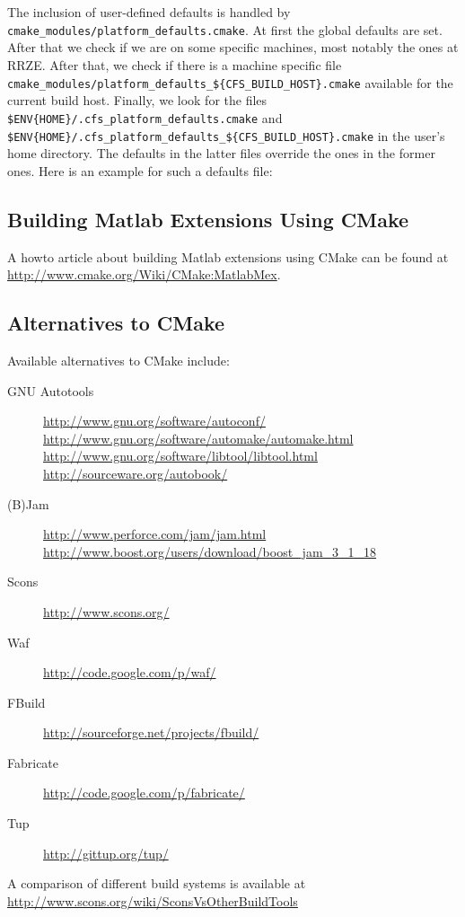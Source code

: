 The    inclusion   of    user-defined    defaults   is    handled   by    {\tt
cmake\_modules/platform\_defaults.cmake}.   At first  the global  defaults are
set. After that we check if we are on some specific machines, most notably the
ones at RRZE.  After  that, we check if there is a  machine specific file {\tt
cmake\_modules/platform\_defaults\_\$\{CFS\_BUILD\_HOST\}.cmake} available for
the   current   build  host.    Finally,   we   look   for  the   files   {\tt
\$ENV\{HOME\}/.cfs\_platform\_defaults.cmake}             and             {\tt
\$ENV\{HOME\}/.cfs\_platform\_defaults\_\$\{CFS\_BUILD\_HOST\}.cmake}  in  the
user's home directory.  The defaults in the latter files  override the ones in
the former ones. Here is an example for such a defaults file:



\subsection{Building Matlab Extensions Using CMake}
A howto article about building Matlab extensions using CMake can be found at 
\url{http://www.cmake.org/Wiki/CMake:MatlabMex}.


\subsection{Alternatives to CMake}
Available alternatives to CMake include:
\begin{description}
\item[GNU Autotools] \url{http://www.gnu.org/software/autoconf/} \url{http://www.gnu.org/software/automake/automake.html} \url{http://www.gnu.org/software/libtool/libtool.html} \url{http://sourceware.org/autobook/}
\item[(B)Jam] \url{http://www.perforce.com/jam/jam.html} \url{http://www.boost.org/users/download/boost_jam_3_1_18}
\item[Scons] \url{http://www.scons.org/}
\item[Waf] \url{http://code.google.com/p/waf/}
\item[FBuild] \url{http://sourceforge.net/projects/fbuild/}
\item[Fabricate] \url{http://code.google.com/p/fabricate/}
\item[Tup] \url{http://gittup.org/tup/}
\end{description}

A    comparison    of    different    build   systems    is    available    at
\url{http://www.scons.org/wiki/SconsVsOtherBuildTools}

